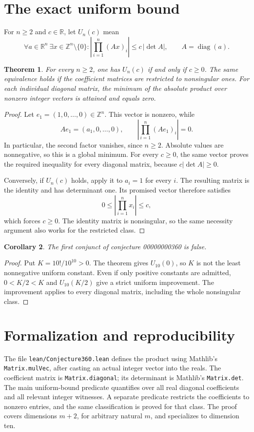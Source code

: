 \documentclass[11pt]{article}
\newtheorem{theorem}{Theorem}
\newtheorem{corollary}[theorem]{Corollary}
\begin{document}
\section{The exact uniform bound}
For $n\geq2$ and $c\in\mathbb R$, let $U_n(c)$ mean
\[
 \forall a\in\mathbb R^n\ \exists x\in\mathbb Z^n\setminus\{0\}:
 \left|\prod_{i=1}^n(Ax)_i\right|\leq c\,|\det A|,
 \qquad A=\operatorname{diag}(a).
\]
\begin{theorem}
For every $n\geq2$, one has $U_n(c)$ if and only if $c\geq0$. The same equivalence holds if the coefficient matrices are restricted to nonsingular ones. For each individual diagonal matrix, the minimum of the absolute product over nonzero integer vectors is attained and equals zero.
\end{theorem}
\begin{proof}
Let $e_1=(1,0,\ldots,0)\in\mathbb Z^n$. This vector is nonzero, while
\[
 Ae_1=(a_1,0,\ldots,0),\qquad
 \left|\prod_{i=1}^n(Ae_1)_i\right|=0.
\]
In particular, the second factor vanishes, since $n\geq2$. Absolute values are nonnegative, so this is a global minimum. For every $c\geq0$, the same vector proves the required inequality for every diagonal matrix, because $c|\det A|\geq0$.

Conversely, if $U_n(c)$ holds, apply it to $a_i=1$ for every $i$. The resulting matrix is the identity and has determinant one. Its promised vector therefore satisfies
\[
 0\leq\left|\prod_{i=1}^n x_i\right|\leq c,
\]
which forces $c\geq0$. The identity matrix is nonsingular, so the same necessity argument also works for the restricted class.
\end{proof}
\begin{corollary}
The first conjunct of conjecture 00000000360 is false.
\end{corollary}
\begin{proof}
Put $K=10!/10^{10}>0$. The theorem gives $U_{10}(0)$, so $K$ is not the least nonnegative uniform constant. Even if only positive constants are admitted, $0<K/2<K$ and $U_{10}(K/2)$ give a strict uniform improvement. The improvement applies to every diagonal matrix, including the whole nonsingular class.
\end{proof}

\section{Formalization and reproducibility}
The file \texttt{lean/Conjecture360.lean} defines the product using Mathlib's \texttt{Matrix.mulVec}, after casting an actual integer vector into the reals. The coefficient matrix is \texttt{Matrix.diagonal}; its determinant is Mathlib's \texttt{Matrix.det}. The main uniform-bound predicate quantifies over all real diagonal coefficients and all relevant integer witnesses. A separate predicate restricts the coefficients to nonzero entries, and the same classification is proved for that class. The proof covers dimensions $m+2$, for arbitrary natural $m$, and specializes to dimension ten.
\end{document}

